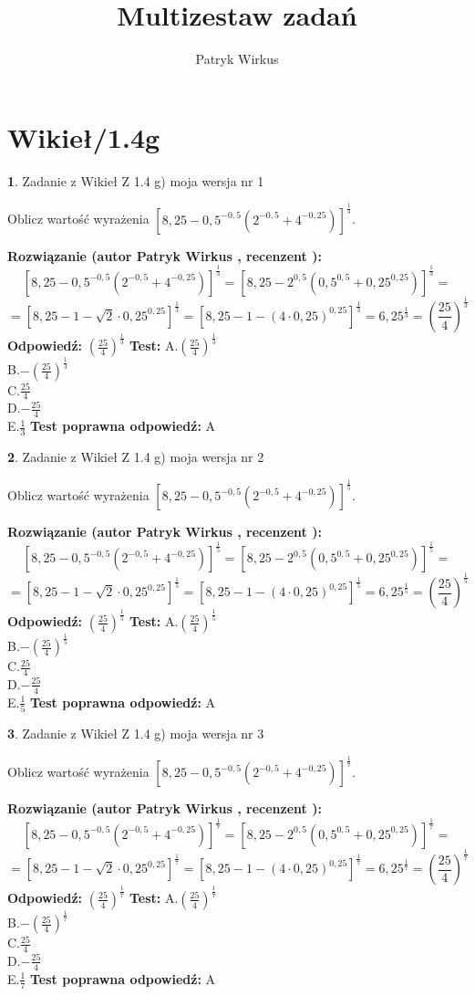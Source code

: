 \documentclass[12pt, a4paper]{article}
\title{Multizestaw zadań}
\author{Patryk Wirkus}
\date{}
\theoremstyle{definition} %
\newtheorem{zad}{}
\newcommand{\kategoria}[1]{\section{#1}}
\newcommand{\zadStart}[1]{\begin{zad}#1\newline}
\newcommand{\zadStop}{\end{zad}}
\newcommand{\rozwStart}[2]{\noindent \textbf{Rozwiązanie (autor #1 , recenzent #2): }\newline}
\newcommand{\rozwStop}{\newline}
\newcommand{\odpStart}{\noindent \textbf{Odpowiedź:}\newline}
\newcommand{\odpStop}{\newline}
\newcommand{\testStart}{\noindent \textbf{Test:}\newline}
\newcommand{\testStop}{\newline}
\newcommand{\kluczStart}{\noindent \textbf{Test poprawna odpowiedź:}\newline}
\newcommand{\kluczStop}{\newline}
\begin{document}
\maketitle

\kategoria{Wikieł/1.4g}


\zadStart{Zadanie z Wikieł Z 1.4 g) moja wersja nr 1}

Oblicz wartość wyrażenia $[8,25-0,5^{-0,5}(2^{-0,5}+4^{-0,25})]^{\frac{1}{3}}$.
\zadStop
\rozwStart{Patryk Wirkus}{}
$$[8,25-0,5^{-0,5}(2^{-0,5}+4^{-0,25})]^{\frac{1}{3}} = [8,25-2^{0,5}(0,5^{0,5}+0,25^{0,25})]^{\frac{1}{3}} =$$
$$=[8,25 - 1 - \sqrt{2} \cdot 0,25^{0,25}]^{\frac{1}{3}} = [8,25 - 1 - (4\cdot 0,25)^{0,25}]^{\frac{1}{3}} = 6,25^{\frac{1}{3}} = (\frac{25}{4})^{\frac{1}{3}}$$
\rozwStop
\odpStart
$(\frac{25}{4})^{\frac{1}{3}}$
\odpStop
\testStart
A.$(\frac{25}{4})^{\frac{1}{3}}$\\ B.$-(\frac{25}{4})^{\frac{1}{3}}$\\ C.$\frac{25}{4}$\\ D.$-\frac{25}{4}$\\ E.$\frac{1}{3}$
\testStop
\kluczStart
A
\kluczStop



\zadStart{Zadanie z Wikieł Z 1.4 g) moja wersja nr 2}

Oblicz wartość wyrażenia $[8,25-0,5^{-0,5}(2^{-0,5}+4^{-0,25})]^{\frac{1}{5}}$.
\zadStop
\rozwStart{Patryk Wirkus}{}
$$[8,25-0,5^{-0,5}(2^{-0,5}+4^{-0,25})]^{\frac{1}{5}} = [8,25-2^{0,5}(0,5^{0,5}+0,25^{0,25})]^{\frac{1}{5}} =$$
$$=[8,25 - 1 - \sqrt{2} \cdot 0,25^{0,25}]^{\frac{1}{5}} = [8,25 - 1 - (4\cdot 0,25)^{0,25}]^{\frac{1}{5}} = 6,25^{\frac{1}{5}} = (\frac{25}{4})^{\frac{1}{5}}$$
\rozwStop
\odpStart
$(\frac{25}{4})^{\frac{1}{5}}$
\odpStop
\testStart
A.$(\frac{25}{4})^{\frac{1}{5}}$\\ B.$-(\frac{25}{4})^{\frac{1}{5}}$\\ C.$\frac{25}{4}$\\ D.$-\frac{25}{4}$\\ E.$\frac{1}{5}$
\testStop
\kluczStart
A
\kluczStop



\zadStart{Zadanie z Wikieł Z 1.4 g) moja wersja nr 3}

Oblicz wartość wyrażenia $[8,25-0,5^{-0,5}(2^{-0,5}+4^{-0,25})]^{\frac{1}{7}}$.
\zadStop
\rozwStart{Patryk Wirkus}{}
$$[8,25-0,5^{-0,5}(2^{-0,5}+4^{-0,25})]^{\frac{1}{7}} = [8,25-2^{0,5}(0,5^{0,5}+0,25^{0,25})]^{\frac{1}{7}} =$$
$$=[8,25 - 1 - \sqrt{2} \cdot 0,25^{0,25}]^{\frac{1}{7}} = [8,25 - 1 - (4\cdot 0,25)^{0,25}]^{\frac{1}{7}} = 6,25^{\frac{1}{7}} = (\frac{25}{4})^{\frac{1}{7}}$$
\rozwStop
\odpStart
$(\frac{25}{4})^{\frac{1}{7}}$
\odpStop
\testStart
A.$(\frac{25}{4})^{\frac{1}{7}}$\\ B.$-(\frac{25}{4})^{\frac{1}{7}}$\\ C.$\frac{25}{4}$\\ D.$-\frac{25}{4}$\\ E.$\frac{1}{7}$
\testStop
\kluczStart
A
\kluczStop
\end{document}
